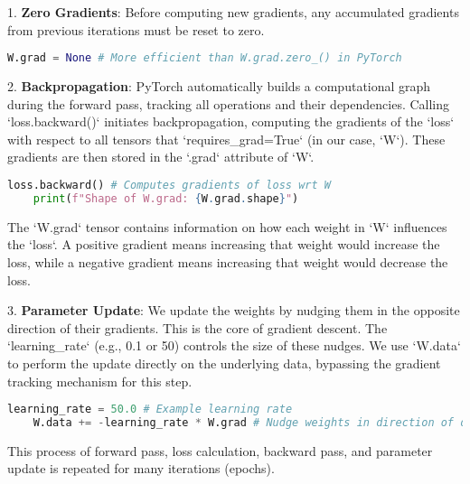 1.  \textbf{Zero Gradients}: Before computing new gradients, any accumulated gradients from previous iterations must be reset to zero.

    \begin{lstlisting}[language=Python, caption=Zeroing Gradients]
    W.grad = None # More efficient than W.grad.zero_() in PyTorch
    \end{lstlisting}

2.  \textbf{Backpropagation}: PyTorch automatically builds a computational graph during the forward pass, tracking all operations and their dependencies. Calling `loss.backward()` initiates backpropagation, computing the gradients of the `loss` with respect to all tensors that `requires_grad=True` (in our case, `W`). These gradients are then stored in the `.grad` attribute of `W`.

    \begin{lstlisting}[language=Python, caption=Backpropagation]
    loss.backward() # Computes gradients of loss wrt W
    print(f"Shape of W.grad: {W.grad.shape}")
    \end{lstlisting}

    The `W.grad` tensor contains information on how each weight in `W` influences the `loss`. A positive gradient means increasing that weight would increase the loss, while a negative gradient means increasing that weight would decrease the loss.

3.  \textbf{Parameter Update}: We update the weights by nudging them in the opposite direction of their gradients. This is the core of gradient descent. The `learning_rate` (e.g., 0.1 or 50) controls the size of these nudges. We use `W.data` to perform the update directly on the underlying data, bypassing the gradient tracking mechanism for this step.

    \begin{lstlisting}[language=Python, caption=Updating Weights]
    learning_rate = 50.0 # Example learning rate
    W.data += -learning_rate * W.grad # Nudge weights in direction of decreasing loss
    \end{lstlisting}

This process of forward pass, loss calculation, backward pass, and parameter update is repeated for many iterations (epochs).

